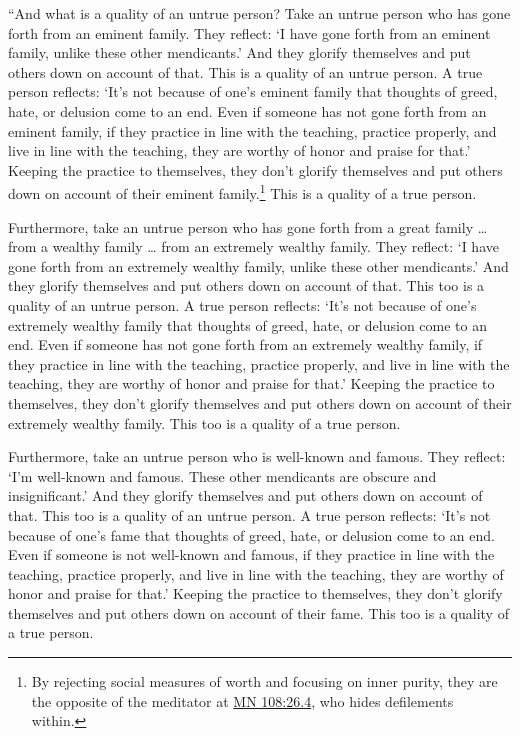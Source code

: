 \documentclass[12pt,openany]{book}%
\begin{document}
“And what is a quality of an untrue person? Take an untrue person who has gone forth from an eminent family. They reflect: ‘I have gone forth from an eminent family, unlike these other mendicants.’ And they glorify themselves and put others down on account of that. This is a quality of an untrue person. A true person reflects: ‘It’s not because of one’s eminent family that thoughts of greed, hate, or delusion come to an end. Even if someone has not gone forth from an eminent family, if they practice in line with the teaching, practice properly, and live in line with the teaching, they are worthy of honor and praise for that.’ Keeping the practice to themselves, they don’t glorify themselves and put others down on account of their eminent family.\footnote{By rejecting social measures of worth and focusing on inner purity, they are the opposite of the meditator at \href{https://suttacentral.net/mn108/en/sujato\#26.4}{MN 108:26.4}, who hides defilements within. } This is a quality of a true person. 

Furthermore, take an untrue person who has gone forth from a great family … from a wealthy family … from an extremely wealthy family. They reflect: ‘I have gone forth from an extremely wealthy family, unlike these other mendicants.’ And they glorify themselves and put others down on account of that. This too is a quality of an untrue person. A true person reflects: ‘It’s not because of one’s extremely wealthy family that thoughts of greed, hate, or delusion come to an end. Even if someone has not gone forth from an extremely wealthy family, if they practice in line with the teaching, practice properly, and live in line with the teaching, they are worthy of honor and praise for that.’ Keeping the practice to themselves, they don’t glorify themselves and put others down on account of their extremely wealthy family. This too is a quality of a true person. 

Furthermore, take an untrue person who is well-known and famous. They reflect: ‘I’m well-known and famous. These other mendicants are obscure and insignificant.’ And they glorify themselves and put others down on account of that. This too is a quality of an untrue person. A true person reflects: ‘It’s not because of one’s fame that thoughts of greed, hate, or delusion come to an end. Even if someone is not well-known and famous, if they practice in line with the teaching, practice properly, and live in line with the teaching, they are worthy of honor and praise for that.’ Keeping the practice to themselves, they don’t glorify themselves and put others down on account of their fame. This too is a quality of a true person. 
\end{document}
